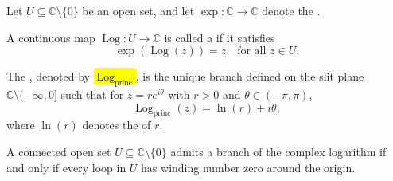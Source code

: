 \begin{definition}
\label{definition:branch_of_the_complex_logarithm_on_an_open_subset}
Let $U \subseteq \mathbb{C} \setminus \{0\}$ be an open set, and let $\exp : \mathbb{C} \to \mathbb{C}$ denote the .

A continuous map $\operatorname{Log} : U \to \mathbb{C}$ is called a  if it satisfies
$$\exp(\operatorname{Log}(z)) = z \quad \text{for all } z \in U.$$

The , denoted by \hl{$\operatorname{Log}_{\mathrm{princ}}$}, is the unique branch defined on the slit plane $\mathbb{C} \setminus (-\infty, 0]$ such that for $z = r e^{i\theta}$ with $r > 0$ and $\theta \in (-\pi, \pi)$,
$$\operatorname{Log}_{\mathrm{princ}}(z) = \ln(r) + i\theta,$$
where $\ln(r)$ denotes the  of $r$.

A connected open set $U \subseteq \mathbb{C} \setminus \{0\}$ admits a branch of the complex logarithm if and only if every loop in $U$ has winding number zero around the origin.
\end{definition}
